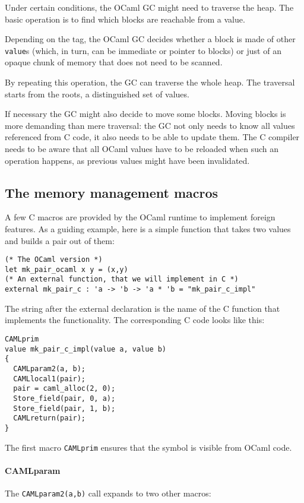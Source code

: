 \documentclass[a4paper]{easychair}
\newcommand{\cpp}[1]{\lstinline[style=C++]{#1}}
\begin{document}
Under certain conditions, the OCaml GC might need to traverse the heap.
The basic operation is to find which blocks are reachable from a value.

Depending on the tag, the OCaml GC decides whether a block is made
of other \cpp{value}s (which, in turn, can be immediate or pointer to
blocks) or just of an opaque chunk of memory that does not need to be
scanned.

By repeating this operation, the GC can traverse the whole heap. The traversal
starts from the roots, a distinguished set of values.

If necessary the GC might also decide to move some blocks.  Moving blocks is more
demanding than mere traversal: the GC not only needs to know all values
referenced from C code, it also needs to be able to update them. The C compiler
needs to be aware that all OCaml values have to be reloaded when such an
operation happens, as previous values might have been invalidated.

\subsection{The memory management macros}

A few C macros are provided by the OCaml runtime to implement foreign
features. As a guiding example, here is a simple function that takes two
values and builds a pair out of them:
%
\begin{lstlisting}[]
(* The OCaml version *)
let mk_pair_ocaml x y = (x,y)
(* An external function, that we will implement in C *)
external mk_pair_c : 'a -> 'b -> 'a * 'b = "mk_pair_c_impl"
\end{lstlisting}

The string after the external declaration is the name of the C function that
implements the functionality.  The corresponding C code looks like this:
%
\begin{lstlisting}[style=C++]
CAMLprim
value mk_pair_c_impl(value a, value b)
{
  CAMLparam2(a, b);
  CAMLlocal1(pair);
  pair = caml_alloc(2, 0);
  Store_field(pair, 0, a);
  Store_field(pair, 1, b);
  CAMLreturn(pair);
}
\end{lstlisting}

The first macro \cpp{CAMLprim} ensures that the symbol is visible from OCaml
code.

\paragraph{CAMLparam}
The \cpp{CAMLparam2(a,b)} call expands to two other macros:
\end{document}
